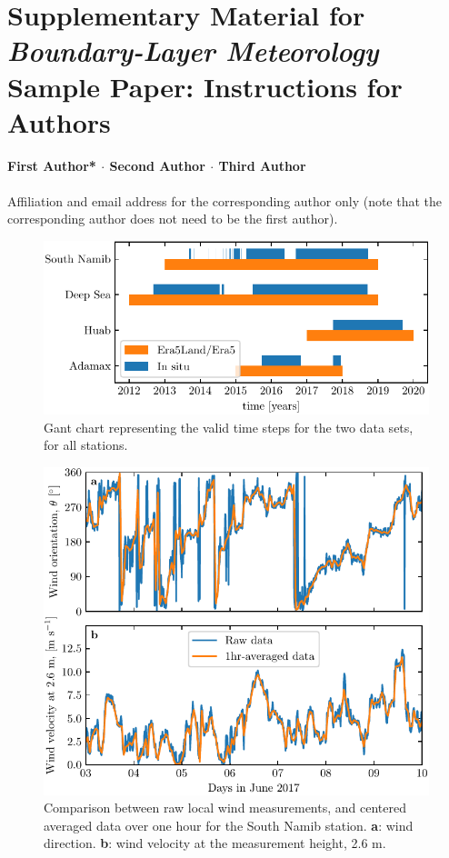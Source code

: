 \clearpage




\newpage
\renewcommand{\thefigure}{S\arabic{figure}}
\setcounter{figure}{0}

\section*{Supplementary Material for \textit{Boundary-Layer Meteorology} Sample Paper: Instructions for Authors}

{\textbf{First Author* $\cdot$ Second Author $\cdot$ Third Author \\}}
\\
\text{*}Affiliation and email address for the corresponding author only (note that the corresponding author does not need to be the first author).

\begin{figure}
  \centering
  \includegraphics[scale=1]{Figures/Figure1_supp.pdf}
  \caption{Gant chart representing the valid time steps for the two data sets, for all stations.}
  \label{Fig1_supp}
\end{figure}

\begin{figure}
  \centering
  \includegraphics[scale=1]{Figures/Figure2_supp.pdf}
  \caption{Comparison between raw local wind measurements, and centered averaged data over one hour for the South Namib station. \textbf{a}: wind direction. \textbf{b}: wind velocity at the measurement height, 2.6 m.}
  \label{Fig2_supp}
\end{figure}

